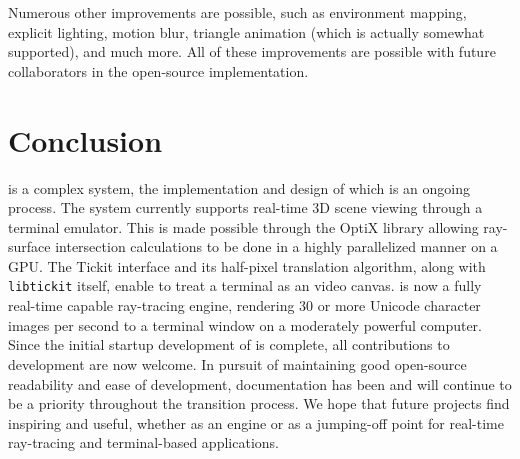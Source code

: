 Numerous other improvements are possible, such as environment mapping, explicit lighting, motion blur, triangle animation (which is actually somewhat supported), and much more.
All of these improvements are possible with future collaborators in the open-source \name{} implementation.

\section{Conclusion}\label{ch:conclusion:end}

\name{} is a complex system, the implementation and design of which is an ongoing process.
The system currently supports real-time 3D scene viewing through a terminal emulator.
This is made possible through the OptiX library allowing ray-surface intersection calculations to be done in a highly parallelized manner on a GPU.
The Tickit interface and its half-pixel translation algorithm, along with \texttt{libtickit} itself, enable \name{} to treat a terminal as an video canvas.
\name{} is now a fully real-time capable ray-tracing engine, rendering 30 or more Unicode character images per second to a terminal window on a moderately powerful computer.
Since the initial startup development of \name{} is complete, all contributions to \name{} development are now welcome.
In pursuit of maintaining good open-source readability and ease of development, documentation has been and will continue to be a priority throughout the transition process.
We hope that future projects find \name{} inspiring and useful, whether as an engine or as a jumping-off point for real-time ray-tracing and terminal-based applications.
